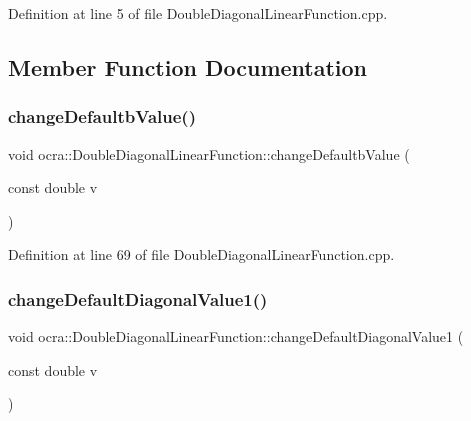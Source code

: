 Definition at line 5 of file Double\+Diagonal\+Linear\+Function.\+cpp.



\subsection{Member Function Documentation}
\hypertarget{classocra_1_1DoubleDiagonalLinearFunction_a8af650affad3759e7a069d0cabcd4c2e}{}\label{classocra_1_1DoubleDiagonalLinearFunction_a8af650affad3759e7a069d0cabcd4c2e} 
\subsubsection{\texorpdfstring{change\+Defaultb\+Value()}{changeDefaultbValue()}}
{\footnotesize\ttfamily void ocra\+::\+Double\+Diagonal\+Linear\+Function\+::change\+Defaultb\+Value (\begin{DoxyParamCaption}\item[{const double}]{v }\end{DoxyParamCaption})\hspace{0.3cm}{\ttfamily [virtual]}}



Definition at line 69 of file Double\+Diagonal\+Linear\+Function.\+cpp.

\hypertarget{classocra_1_1DoubleDiagonalLinearFunction_a982adc5313b550ac6fa3b420051a9505}{}\label{classocra_1_1DoubleDiagonalLinearFunction_a982adc5313b550ac6fa3b420051a9505} 
\subsubsection{\texorpdfstring{change\+Default\+Diagonal\+Value1()}{changeDefaultDiagonalValue1()}}
{\footnotesize\ttfamily void ocra\+::\+Double\+Diagonal\+Linear\+Function\+::change\+Default\+Diagonal\+Value1 (\begin{DoxyParamCaption}\item[{const double}]{v }\end{DoxyParamCaption})\hspace{0.3cm}{\ttfamily [virtual]}}



